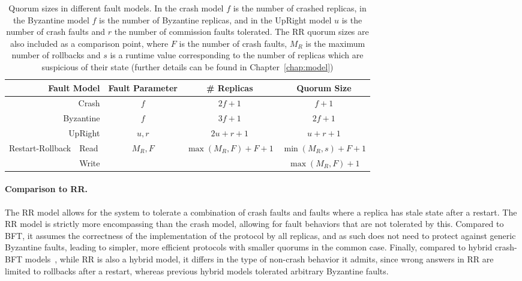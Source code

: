 \begin{table}[ht]
    \centering
    \caption{Quorum sizes in different fault models. In the crash
    model $f$ is the number of crashed replicas, in the Byzantine
    model $f$ is the number of Byzantine replicas, and in the
    UpRight model $u$ is the number of crash faults and $r$
    the number of commission faults tolerated. The \ac{RR}
    quorum sizes are also included as a comparison point, where $F$ is
    the number of crash faults, $M_R$ is the maximum number of
    rollbacks and $s$ is a runtime value corresponding to the
    number of replicas which are suspicious of their state
    (further details can be found in Chapter~\ref{chap:model})}
    \begin{tabular}{|r|l|c|c|c|}
        \hline
        \multicolumn{2}{|r|}{\textbf{Fault Model}}           & \textbf{Fault Parameter}         & \textbf{\# Replicas} & \textbf{Quorum Size}          \\
        \hline
\multicolumn{2}{|r|}{Crash}                 & $f$ &  $2 f + 1$ & $f + 1$                     \\
        \hline
\multicolumn{2}{|r|}{Byzantine}             & $f$ & $3 f + 1$ & $2 f + 1$                     \\
        \hline
\multicolumn{2}{|r|}{UpRight}               & $u, r$ &  $2 u + r + 1$                 & $u + r + 1$                     \\
        \hline
\multirow{2}{*}{Restart-Rollback} & Read  & \multirow{2}{*}{$M_R, F$} & \multirow{2}{*}{$\max(M_R, F) + F + 1$} & $\min(M_R, s) + F + 1$ \\
\cline{2-2}\cline{5-5}
                                  & Write & &                   & $\max(M_R, F) + 1$ \\
        \hline
    \end{tabular}\label{tab:quorum}
\end{table}

\paragraph{Comparison to \ac{RR}.}
The \ac{RR} model allows for the system to tolerate a combination of
crash faults and faults where a replica has stale state after a
restart. The \ac{RR} model is strictly more encompassing than
the crash model, allowing for fault behaviors that are
not tolerated by this. Compared to \ac{BFT}, it assumes the
correctness of the implementation of the protocol by all
replicas, and as such does not need to protect against generic Byzantine faults, leading to simpler,
more efficient protocols with smaller quorums in the common case.
Finally, compared to hybrid crash-\ac{BFT}
models~\cite{MeyerPradhan91,bc:hybrid,mc:hybrid,upright}, while
\ac{RR} is also a hybrid model, it differs in the type of
non-crash behavior it admits, since wrong answers in \ac{RR}
are limited to rollbacks after a restart, whereas previous hybrid
models tolerated arbitrary Byzantine faults.

